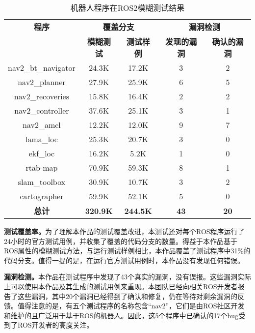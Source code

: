 \begin{table}[H]
	\small
	\caption{机器人程序在ROS2模糊测试结果}
	\centering
	\begin{tabular}{ccccc}
		\hline
		\textbf{程序} & \multicolumn{2}{c}{\textbf{覆盖分支}} & \multicolumn{2}{c}{\textbf{漏洞检测}} \\
		\cline{2-5}
		& \textbf{模糊测试} & \textbf{测试样例} & \textbf{发现的漏洞} & \textbf{确认的漏洞} \\
		\hline
		nav2\_bt\_navigator & 24.3K & 17.2K & 3 & 2 \\
		nav2\_planner & 27.9K & 25.9K & 6 & 5 \\
		nav2\_recoveries & 15.8K & 16.4K & 2 & 2 \\
		nav2\_controller & 37.6K & 25.1K & 3 & 1 \\
		nav2\_amcl & 12.2K & 12.0K & 9 & 7 \\
		lama\_loc & 25.3K & 20.7K & 3 & 0 \\
		ekf\_loc & 16.2K & 5.2K & 1 & 0 \\
		rtab-map & 70.9K & 59.3K & 8 & 1 \\
		slam\_toolbox & 30.9K & 10.7K & 3 & 2 \\
		cartographer & 59.9K & 52.1K & 5 & 0 \\
		\textbf{总计} & \textbf{320.9K} & \textbf{244.5K} & \textbf{43} & \textbf{20} \\
		\hline
	\end{tabular}
\end{table}

\textbf{测试覆盖率。}为了理解本作品的测试覆盖改进，本测试还对每个ROS程序运行了24小时的官方测试用例，并收集了覆盖的代码分支的数量。得益于本作品基于ROS属性的模糊测试方法，与运行测试样例相比，本作品覆盖了测试程序中31\%的代码分支。值得一提的是，在运行官方测试用例时，本作品没有发现任何错误。

\textbf{漏洞检测。}本作品在测试程序中发现了43个真实的漏洞，没有误报。这些漏洞实际上可以使用本作品及其生成的测试用例来重现。本团队已经向相关ROS开发者报告了这些漏洞，其中20个漏洞已经得到了确认和修复，仍在等待对剩余漏洞的反馈。值得注意的是，有五个测试程序的名称包含``nav2''，它们是由ROS社区开发和维护的且广泛用于基于ROS的机器人。因此，这5个程序中已确认的17个bug受到了ROS开发者的高度关注。
